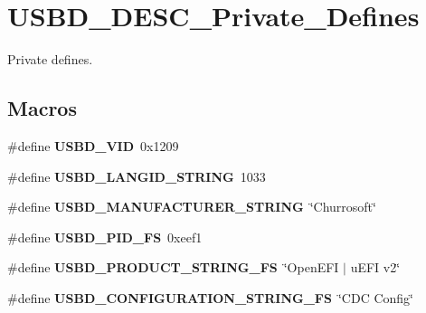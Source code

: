 \hypertarget{group__USBD__DESC__Private__Defines}{}\section{U\+S\+B\+D\+\_\+\+D\+E\+S\+C\+\_\+\+Private\+\_\+\+Defines}
\label{group__USBD__DESC__Private__Defines}


Private defines.  


\subsection*{Macros}
\begin{DoxyCompactItemize}
\item 
\mbox{\label{group__USBD__DESC__Private__Defines_gac5251397ce2246b546b472cd802e6d62}} 
\#define {\bfseries U\+S\+B\+D\+\_\+\+V\+ID}~0x1209
\item 
\mbox{\label{group__USBD__DESC__Private__Defines_ga070dd542d4d914e86fdf103fa5fdd72f}} 
\#define {\bfseries U\+S\+B\+D\+\_\+\+L\+A\+N\+G\+I\+D\+\_\+\+S\+T\+R\+I\+NG}~1033
\item 
\mbox{\label{group__USBD__DESC__Private__Defines_gaee0c9fd7e8265b90126028919cd863a6}} 
\#define {\bfseries U\+S\+B\+D\+\_\+\+M\+A\+N\+U\+F\+A\+C\+T\+U\+R\+E\+R\+\_\+\+S\+T\+R\+I\+NG}~\char`\"{}Churrosoft\char`\"{}
\item 
\mbox{\label{group__USBD__DESC__Private__Defines_gaa6f9e36da39c9881963cabf42df4d216}} 
\#define {\bfseries U\+S\+B\+D\+\_\+\+P\+I\+D\+\_\+\+FS}~0xeef1
\item 
\mbox{\label{group__USBD__DESC__Private__Defines_gaa11017e20e3a2f1ef891b86212c4b730}} 
\#define {\bfseries U\+S\+B\+D\+\_\+\+P\+R\+O\+D\+U\+C\+T\+\_\+\+S\+T\+R\+I\+N\+G\+\_\+\+FS}~\char`\"{}Open\+E\+FI $\vert$ u\+E\+FI v2\char`\"{}
\item 
\mbox{\label{group__USBD__DESC__Private__Defines_gaca5e66e8b6c89a896f6ad16f9a68128f}} 
\#define {\bfseries U\+S\+B\+D\+\_\+\+C\+O\+N\+F\+I\+G\+U\+R\+A\+T\+I\+O\+N\+\_\+\+S\+T\+R\+I\+N\+G\+\_\+\+FS}~\char`\"{}C\+DC Config\char`\"{}

\end{DoxyCompactItemize}
